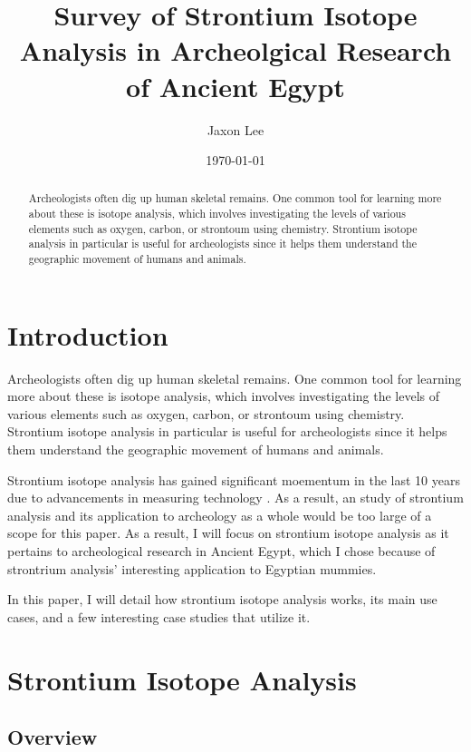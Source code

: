 \documentclass[a4paper, 12pt]{article}
\title{Survey of Strontium Isotope Analysis in Archeolgical Research of Ancient Egypt}
\author{Jaxon Lee}
\date{\today}
\begin{document}
\maketitle

\begin{abstract}
    Archeologists often dig up human skeletal remains. One common tool for learning
    more about these is isotope analysis, which involves investigating the levels of various
    elements such as oxygen, carbon, or strontoum using chemistry. Strontium isotope analysis
    in particular is useful for archeologists since it helps them understand the geographic
    movement of humans and animals.
\end{abstract}

\section{Introduction}
Archeologists often dig up human skeletal remains. One common tool for learning
more about these is isotope analysis, which involves investigating the levels of various
elements such as oxygen, carbon, or strontoum using chemistry. Strontium isotope analysis
in particular is useful for archeologists since it helps them understand the geographic
movement of humans and animals.

Strontium isotope analysis has gained significant moementum in the last 10 years
due to advancements in measuring technology \citep{holt2021}. As a result,
an study of strontium analysis and its application to archeology as a whole
would be too large of a scope for this paper. As a result, I will focus on
strontium isotope analysis as it pertains to archeological research in Ancient
Egypt, which I chose because of strontrium analysis' interesting application
to Egyptian mummies.

In this paper, I will detail how strontium isotope analysis works, its main
use cases, and a few interesting case studies that utilize it.


\section{Strontium Isotope Analysis}
\subsection{Overview}
\end{document}
